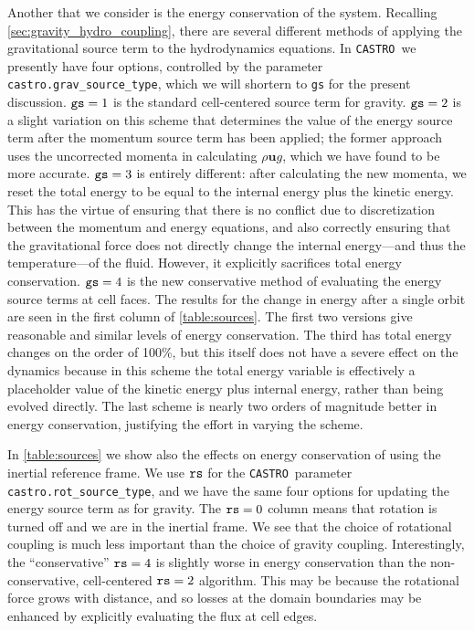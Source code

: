 \documentclass[iop]{../emulateapj}
\newcommand{\castro}{\texttt{CASTRO}}
\begin{document}
Another that we consider is the energy conservation of the system. Recalling \autoref{sec:gravity_hydro_coupling}, 
there are several different methods of applying the gravitational source term to the hydrodynamics equations. In \castro\ we presently 
have four options, controlled by the parameter {\tt castro.grav\_source\_type}, which we will shortern to {\tt gs} for the present 
discussion. ${\tt gs} = 1$ is the standard cell-centered source term for gravity. ${\tt gs} = 2$ is a slight variation on this scheme 
that determines the value of the energy source term after the momentum source term has been applied; the former approach uses 
the uncorrected momenta in calculating $\rho \mathbf{u} g$, which we have found to be more accurate. ${\tt gs} = 3$ is entirely 
different: after calculating the new momenta, we reset the total energy to be equal to the internal energy plus the 
kinetic energy. This has the virtue of ensuring that there is no conflict due to discretization between the momentum and 
energy equations, and also correctly ensuring that the gravitational force does not directly change the internal energy---and thus the temperature---of the fluid. However, it explicitly sacrifices total energy conservation. ${\tt gs} = 4$ is 
the new conservative method of evaluating the energy source terms at cell faces. The results for the change in energy 
after a single orbit are seen in the first column of \autoref{table:sources}. The first two versions give reasonable and 
similar levels of energy conservation. The third has total energy changes on the order of 100\%, but this itself 
does not have a severe effect on the dynamics because in this scheme the total energy variable is effectively a placeholder 
value of the kinetic energy plus internal energy, rather than being evolved directly. The last scheme is nearly two orders 
of magnitude better in energy conservation, justifying the effort in varying the scheme.

In \autoref{table:sources} we show also the effects on energy conservation of using the inertial reference frame. 
We use ${\tt rs}$ for the \castro\ parameter {\tt castro.rot\_source\_type}, and we have the same four options for updating
the energy source term as for gravity. The ${\tt rs} = 0$ column means that rotation is turned off and we are 
in the inertial frame. We see that the choice of rotational coupling is much less important than the choice of gravity coupling. 
Interestingly, the ``conservative'' ${\tt rs} = 4$ is slightly worse in energy conservation than the non-conservative, 
cell-centered ${\tt rs} = 2$ algorithm. This may be because the rotational force grows with distance, and so losses at the 
domain boundaries may be enhanced by explicitly evaluating the flux at cell edges.
\end{document}
